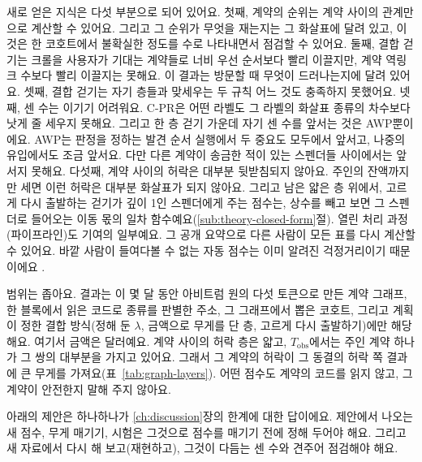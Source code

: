 새로 얻은 지식은 다섯 부분으로 되어 있어요. 첫째, 계약의 순위는 계약 사이의 관계만으로 계산할 수 있어요. 그리고 그 순위가 무엇을 재는지는 그 화살표에 달려 있고, 이것은 한 코호트에서 불확실한 정도를 수로 나타내면서 점검할 수 있어요. 둘째, 결합 걷기는 크롤을 사용자가 기대는 계약들로 너비 우선 순서보다 빨리 이끌지만, 계약 역링크 수보다 빨리 이끌지는 못해요. 이 결과는 방문할 때 무엇이 드러나는지에 달려 있어요. 셋째, 결합 걷기는 자기 층들과 맞세우는 두 규칙 어느 것도 충족하지 못했어요. 넷째, 센 수는 이기기 어려워요. \mbox{C-PR}은 어떤 라벨도 그 라벨의 화살표 종류의 차수보다 낫게 줄 세우지 못해요. 그리고 한 층 걷기 가운데 자기 센 수를 앞서는 것은 AWP뿐이에요. AWP는 판정을 정하는 발견 순서 실행에서 두 중요도 모두에서 앞서고, 나중의 유입에서도 조금 앞서요. 다만 다른 계약이 송금한 적이 있는 스펜더들 사이에서는 앞서지 못해요. 다섯째, 계약 사이의 허락은 대부분 뒷받침되지 않아요. 주인의 잔액까지만 세면 이런 허락은 대부분 화살표가 되지 않아요. 그리고 남은 얇은 층 위에서, 고르게 다시 출발하는 걷기가 깊이 1인 스펜더에게 주는 점수는, 상수를 빼고 보면 그 스펜더로 들어오는 이동 몫의 일차 함수예요(\ref{sub:theory-closed-form}절). 열린 처리 과정(파이프라인)도 기여의 일부예요. 그 공개 요약으로 다른 사람이 모든 표를 다시 계산할 수 있어요. 바깥 사람이 들여다볼 수 없는 자동 점수는 이미 알려진 걱정거리이기 때문이에요 \parencite{packin2024credit}.

범위는 좁아요. 결과는 이 몇 달 동안 아비트럼 원의 다섯 토큰으로 만든 계약 그래프, 한 블록에서 읽은 코드로 종류를 판별한 주소, 그 그래프에서 뽑은 코호트, 그리고 계획이 정한 결합 방식(정해 둔 $\lambda$, 금액으로 무게를 단 층, 고르게 다시 출발하기)에만 해당해요. 여기서 금액은 달러예요. 계약 사이의 허락 층은 얇고, $T_{\mathrm{obs}}$에서는 주인 계약 하나가 그 쌍의 대부분을 가지고 있어요. 그래서 그 계약의 허락이 그 동결의 허락 쪽 결과에 큰 무게를 가져요(표~\ref{tab:graph-layers}). 어떤 점수도 계약의 코드를 읽지 않고, 그 계약이 안전한지 말해 주지 않아요.


아래의 제안은 하나하나가 \ref{ch:discussion}장의 한계에 대한 답이에요. 제안에서 나오는 새 점수, 무게 매기기, 시험은 그것으로 점수를 매기기 전에 정해 두어야 해요. 그리고 새 자료에서 다시 해 보고(재현하고), 그것이 다듬는 센 수와 견주어 점검해야 해요.

